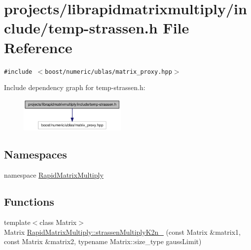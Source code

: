 \hypertarget{temp-strassen_8h}{
\section{projects/librapidmatrixmultiply/include/temp-strassen.h File Reference}
\label{temp-strassen_8h}
}
{\tt \#include $<$boost/numeric/ublas/matrix\_\-proxy.hpp$>$}\par


Include dependency graph for temp-strassen.h:\nopagebreak
\begin{figure}[H]
\begin{center}
\leavevmode
\includegraphics[width=148pt]{temp-strassen_8h__incl}
\end{center}
\end{figure}
\subsection*{Namespaces}
\begin{CompactItemize}
\item 
namespace \hyperlink{namespaceRapidMatrixMultiply}{RapidMatrixMultiply}
\end{CompactItemize}
\subsection*{Functions}
\begin{CompactItemize}
\item 
{\footnotesize template$<$class Matrix$>$ }\\Matrix \hyperlink{namespaceRapidMatrixMultiply_b79be5fd9d32a42401aa8c1a7fcbda32}{RapidMatrixMultiply::strassenMultiplyK2n\_\-} (const Matrix \&matrix1, const Matrix \&matrix2, typename Matrix::size\_\-type gaussLimit)
\end{CompactItemize}
